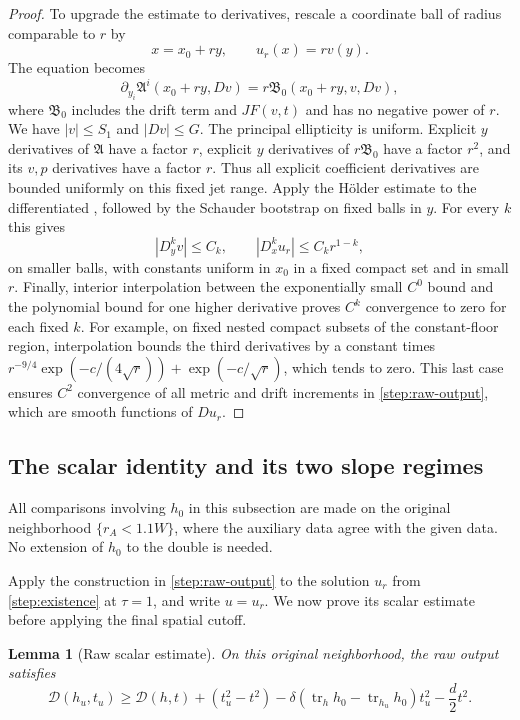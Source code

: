 \documentclass[11pt]{article}
\numberwithin{equation}{section}
\newtheorem{lemma}[theorem]{Lemma}
\theoremstyle{definition}
\theoremstyle{remark}
\begin{document}
\begin{proof}
To upgrade the estimate to derivatives, rescale a coordinate ball of
radius comparable to $r$ by
\[
 x=x_0+ry,\qquad u_r(x)=r v(y).
\]
The equation becomes
\begin{equation}\label{step:rescaled}
 \partial_{y_i}\mathfrak A^i(x_0+ry,Dv)
 =r\mathfrak B_0(x_0+ry,v,Dv),
\end{equation}
where $\mathfrak B_0$ includes the drift term and $JF(v,t)$ and has no
negative power of $r$.  We have $|v|\le S_1$ and $|Dv|\le G$.
The principal ellipticity is uniform.  Explicit $y$ derivatives of
$\mathfrak A$ have a factor $r$, explicit $y$ derivatives of
$r\mathfrak B_0$ have a factor $r^2$, and its $v,p$ derivatives have a
factor $r$.  Thus all explicit coefficient derivatives are bounded
uniformly on this fixed jet range. Apply the H\"older estimate to the
differentiated , followed by the
Schauder bootstrap on fixed balls in $y$. For every $k$ this gives
\[
 |D_y^kv|\le C_k,\qquad |D_x^ku_r|\le C_kr^{1-k},
\]
on smaller balls, with constants uniform in $x_0$ in a fixed compact
set and in small $r$.  Finally, interior interpolation between the
exponentially small $C^0$ bound and the polynomial bound for one higher
derivative proves $C^k$ convergence to zero for each fixed $k$.
For example, on fixed nested compact subsets of the constant-floor region,
interpolation bounds the third derivatives by a constant times
$r^{-9/4}\exp(-c/(4\sqrt r))+\exp(-c/\sqrt r)$, which tends to zero.  This
last case ensures $C^2$ convergence of all metric and drift increments
in \cref{step:raw-output}, which are smooth functions of $Du_r$.
\end{proof}

\subsection{The scalar identity and its two slope regimes}

All comparisons involving $h_0$ in this subsection are made on the
original neighborhood $\{r_A<1.1W\}$, where the auxiliary data agree
with the given data.  No extension of $h_0$ to the double is needed.

Apply the construction in \cref{step:raw-output} to the solution $u_r$
from \cref{step:existence} at $\tau=1$, and write $u=u_r$. We now prove
its scalar estimate before applying the final spatial cutoff.

\begin{lemma}[Raw scalar estimate]\label{step:raw-estimate}
On this original neighborhood, the raw output satisfies
\begin{equation}\label{step:raw-inequality}
 \mathcal D(h_u,t_u)\ge\mathcal D(h,t)+(t_u^2-t^2)
 -\delta(\operatorname{tr}_hh_0-\operatorname{tr}_{h_u}h_0)t_u^2-\frac d2t^2.
\end{equation}
\end{lemma}
\end{document}

